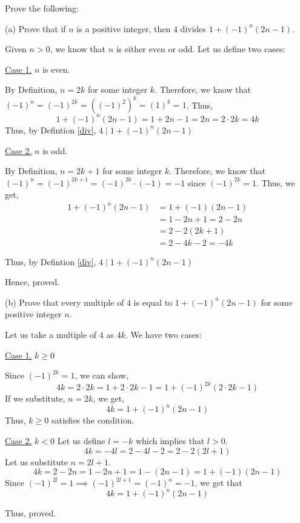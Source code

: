 \begin{problem}
	Prove the following:

	(a) Prove that if $n$ is a positive integer, then $4$ divides $1 + (-1)^n(2n-1)$.
	\begin{solution}
		Given $n > 0$, we know that $n$ is either even or odd. Let us define two cases:

		\underline{Case 1.} $n$ is even.

		By Definition, $n = 2k$ for some integer $k$. 
		Therefore, we know that $(-1)^n = (-1)^{2k} = ((-1)^2)^k = (1)^k = 1$. Thus, 
		$$1 + (-1)^n(2n-1) = 1 + 2n-1 = 2n = 2 \cdot 2k = 4k$$
		Thus, by Defintion \ref{div}, $4 \mid 1 + (-1)^n(2n-1)$
		
		\underline{Case 2.} $n$ is odd.

		By Definition, $n = 2k+1$ for some integer $k$. 
		Therefore, we know that $(-1)^n = (-1)^{2k+1} = (-1)^{2k} \cdot (-1) = -1$ since $(-1)^{2k} = 1$.
		Thus, we get,
		\begin{align}
			1 + (-1)^n(2n-1) &= 1 + (-1)(2n-1) \\
											 &= 1 - 2n + 1 = 2 - 2n \\
											 &= 2 - 2(2k+1) \\
											 &= 2 - 4k - 2 = -4k
		\end{align}

		Thus, by Defintion \ref{div}, $4 \mid 1 + (-1)^n(2n-1)$


		Hence, proved.
	\end{solution}

	(b) Prove that every multiple of $4$ is equal to $1 + (-1)^n(2n-1)$ for some positive integer $n$.
	\begin{solution}
		Let us take a multiple of $4$ as $4k$. We have two cases:
		
		\underline{Case 1.} $k \geq 0$

		Since $(-1)^{2k} = 1$, we can show,
		$$4k = 2 \cdot 2k = 1 + 2 \cdot 2k - 1 = 1 + (-1)^{2k}(2 \cdot 2k - 1)$$
		If we substitute, $n = 2k$, we get, 
		$$4k = 1 + (-1)^n(2n-1)$$
		Thus, $k \geq 0$ satisfies the condition.

		\underline{Case 2.} $k < 0$
		Let us define $l = -k$ which implies that $l > 0$.
		$$4k = -4l =  2 - 4l - 2 = 2 - 2(2l+1)$$
		Let us substitute $n = 2l+1$.
		$$4k = 2 - 2n = 1 - 2n + 1 = 1 - (2n-1) = 1 + (-1)(2n-1)$$
		Since $(-1)^{2l} = 1 \implies (-1)^{2l+1} = (-1)^n = -1$, we get that
		$$4k = 1 + (-1)^n(2n-1)$$

		Thus, proved.
	\end{solution}
\end{problem}


